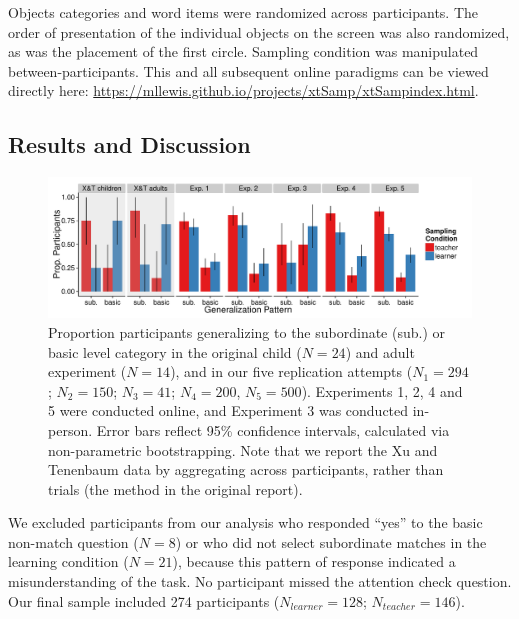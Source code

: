 \documentclass[man]{apa2}
\begin{document}
Objects categories and word items were randomized across participants. The order of presentation of the individual objects on the screen was also randomized, as was the placement of the first circle. Sampling condition was manipulated between-participants. This and all subsequent online paradigms can be viewed directly here: \url{https://mllewis.github.io/projects/xtSamp/xtSampindex.html}.

\subsection{Results and Discussion}

 \begin{figure} [t]
 \begin{center} 
 \includegraphics[width=6.2in]{figures/FIG_2.pdf} 
 \caption{\label{fig:bar_plots} Proportion participants generalizing to the subordinate (sub.) or basic level category in the original child ($N = 24$) and adult experiment ($N = 14$), and in our five replication attempts ($N_{1} = 294$; $N_{2} = 150$; $N_{3} = 41$; $N_{4} = 200$, $N_{5} = 500$). Experiments 1, 2, 4 and 5 were conducted online, and Experiment 3 was conducted in-person. Error bars reflect 95\% confidence intervals, calculated via non-parametric bootstrapping. Note that we report the Xu and Tenenbaum data by aggregating across participants, rather than trials (the method in the original report).} 
 \end{center} 
\end{figure}

We excluded participants from our analysis who responded ``yes'' to the basic non-match question ($N=8$) or who did not select subordinate matches in the learning condition ($N = 21$), because this pattern of response indicated a misunderstanding of the task. No participant missed the attention check question. Our final sample included 274 participants ($N_{learner} = 128$; $N_{teacher} = 146$).
\end{document}
